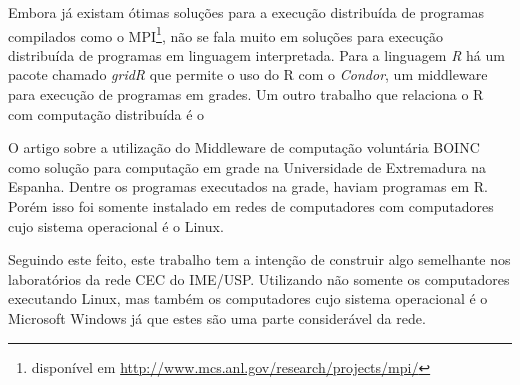Embora já existam ótimas soluções para a execução distribuída de programas compilados como o
 MPI\footnote{disponível em \url{http://www.mcs.anl.gov/research/projects/mpi/}}, não se fala muito em soluções 
para execução distribuída de programas em linguagem interpretada. 
Para a linguagem \emph{R} há um pacote chamado \emph{gridR} que permite o uso do R com o \emph{Condor}, %
um middleware para execução de programas em grades.  Um outro trabalho que relaciona o R com computação distribuída é o %


O artigo %
sobre a utilização do Middleware de computação voluntária BOINC como solução para computação 
em grade na Universidade de Extremadura na Espanha. Dentre os programas executados na grade, haviam
programas em R. Porém isso foi somente instalado em redes de computadores com computadores cujo sistema
operacional é o Linux. 

Seguindo este feito, este trabalho tem a intenção de construir algo semelhante nos laboratórios da rede CEC do IME/USP. Utilizando
não somente os computadores executando Linux, mas também os computadores cujo sistema operacional é o Microsoft Windows %
já que estes são uma parte considerável da rede.  

